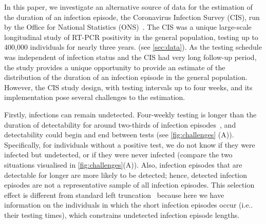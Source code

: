 \documentclass[12pt]{article}
\makeatletter
\DeclareRobustCommand\onedot{\futurelet\@let@token\@onedot}
\def\@onedot{\ifx\@let@token.\else.\null\fi\xspace}
\def\eg{e.g\onedot} \def\Eg{{E.g}\onedot}
\def\ie{i.e\onedot} \def\Ie{{I.e}\onedot}
\makeatother
\begin{document}

In this paper, we investigate an alternative source of data for the estimation of the duration of an infection episode, the Coronavirus Infection Survey (CIS), run by the Office for National Statistics (ONS)~\citep{CIS}.
The CIS was a unique large-scale longitudinal study of RT-PCR positivity in the general population, testing up to 400,000 individuals for nearly three years. (see \cref{sec:data}).
As the testing schedule was independent of infection status and the CIS had very long follow-up period, the study provides a unique opportunity to provide an estimate of the distribution of the duration of an infection episode in the general population.
However, the CIS study design, with testing intervals up to four weeks, and its implementation pose several challenges to the estimation.

Firstly, infections can remain undetected.
Four-weekly testing is longer than the duration of detectability for around two-thirds of infection episodes~\citep{killingleySafety}, and detectability could begin and end between tests (see \cref{fig:challenges} (A)).
Specifically, for individuals without a positive test, we do not know if they were infected but undetected, or if they were never infected (compare the two situations visualised in \cref{fig:challenges}(A)).
Also, infection episodes that are detectable for longer are more likely to be detected; hence, detected infection episodes are not a representative sample of all infection episodes.
This selection effect is different from standard left truncation~\cite[e.g.][]{sunEmpirical,bacchettiNonparametric} because here we have information on the individuals in which the short infection episodes occur (\ie their testing times), which constrains undetected infection episode lengths.
\end{document}
